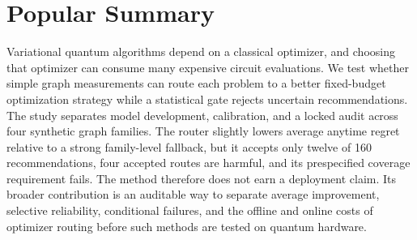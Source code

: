 \section*{Popular Summary}

Variational quantum algorithms depend on a classical optimizer, and choosing
that optimizer can consume many expensive circuit evaluations.  We test
whether simple graph measurements can route each problem to a better
fixed-budget optimization strategy while a statistical gate rejects uncertain
recommendations.  The study separates model development, calibration, and a
locked audit across four synthetic graph families.  The router slightly lowers
average anytime regret relative to a strong family-level fallback, but it
accepts only twelve of 160 recommendations, four accepted routes are harmful,
and its prespecified coverage requirement fails.  The method therefore does
not earn a deployment claim.  Its broader contribution is an auditable way to
separate average improvement, selective reliability, conditional failures,
and the offline and online costs of optimizer routing before such methods are
tested on quantum hardware.
